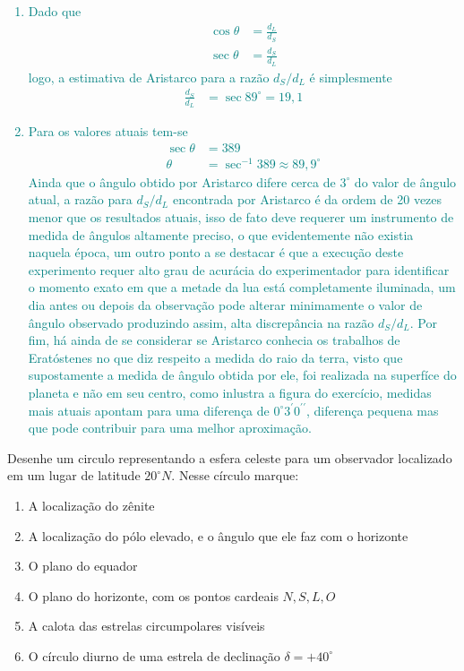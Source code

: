 \begin{sol}
	\textcolor{teal} {
		\begin{enumerate}[label=\alph *)]
			\item Dado que
			\begin{align}
				\cos \theta&=\frac{d_L}{d_S} \nonumber \\
				\sec \theta&=\frac{d_S}{d_L}
			\end{align}
			logo, a estimativa de Aristarco para a razão $d_S/d_L$ é simplesmente
			\begin{align}
				\frac{d_S}{d_L}&=\sec 89^{\circ}=19,1
			\end{align}
			\item Para os valores atuais tem-se
			\begin{align}
				\sec \theta&=389 \nonumber \\
				\theta&=\sec^{-1}389\approx 89,9^{\circ}				
			\end{align}
			Ainda que o ângulo obtido por Aristarco difere cerca de $3^{\circ}$ do valor de ângulo atual, a razão para $d_S/d_L$ encontrada por Aristarco é da ordem de 20 vezes menor que os resultados atuais, isso de fato deve requerer um instrumento de medida de ângulos altamente preciso, o que evidentemente não existia naquela época, um outro ponto a se destacar é que a execução deste experimento requer alto grau de acurácia do experimentador para identificar o momento exato em que a metade da lua está completamente iluminada, um dia antes ou depois da observação pode alterar minimamente o valor de ângulo observado produzindo assim, alta discrepância na razão $d_S/d_L$. Por fim, há ainda de se considerar se Aristarco conhecia os trabalhos de Eratóstenes no que diz respeito a medida do raio da terra, visto que supostamente a medida de ângulo obtida por ele, foi realizada na superfíce do planeta e não em seu centro, como inlustra a figura do exercício, medidas mais atuais \cite{BERTUOLA2016} apontam para uma diferença de $0^{\circ}3^{\prime }0^{\prime \prime}$, diferença pequena mas que pode contribuir para uma melhor aproximação.
		\end{enumerate}
	}
\end{sol}
\begin{prob}[ref: P09]
	Desenhe um circulo representando a esfera celeste para um observador localizado em um lugar
	de latitude $20^{\circ}N$. Nesse círculo marque:
	\begin{enumerate}[label=\alph *)]
		\item A localização do zênite
		\item A localização do pólo elevado, e o ângulo que ele faz com o horizonte
		\item O plano do equador
		\item O plano do horizonte, com os pontos cardeais $N,S,L,O$
		\item A calota das estrelas circumpolares visíveis
		\item O círculo diurno de uma estrela de declinação $\delta=+40^{\circ}$
	\end{enumerate}
\end{prob}
